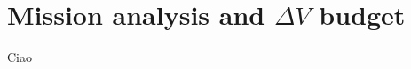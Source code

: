 \section{Mission analysis and \texorpdfstring{$\Delta V$}{Delta-V} budget}
\label{sec:ma_and_dv}

Ciao \cite{fact_sheet}